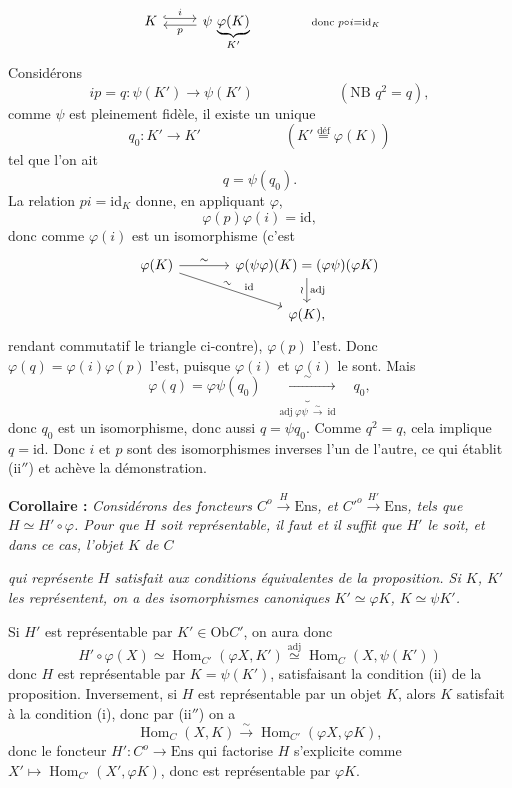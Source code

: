 \documentclass[11pt]{article}
\newcommand{\printedpage}[1]{\marginpar{\footnotesize p.~#1}}
\newcommand{\msp}[1]{\marginpar{\footnotesize [#1]}}
\newcommand{\Hom}{\operatorname{Hom}}
\newcommand{\Ens}{\mathrm{Ens}}
\newcommand{\Ob}{\mathrm{Ob}}
\newcommand{\id}{\mathrm{id}}
\begin{document}
\[
\begin{tikzcd}
K \arrow[r,hook,shift left,"i"] & \psi\,\underbrace{\varphi(K)}_{K'} \arrow[l,shift left,"p"]
\end{tikzcd}
\qquad\qquad {\scriptstyle \text{donc } p\circ i = \id_K}
\]
Considérons
\[
ip = q : \psi(K') \longrightarrow \psi(K') \qquad\qquad\qquad (\text{NB } q^2 = q),
\]
comme $\psi$ est pleinement fidèle, il existe un unique
\[
q_0 : K' \longrightarrow K' \qquad\qquad\qquad (K' \overset{\text{déf}}{=} \varphi(K))
\]
tel que l'on ait
\[
q = \psi(q_0).
\]
La relation $pi = \id_K$ donne, en appliquant $\varphi$,
\[
\varphi(p)\varphi(i) = \id,
\]
donc comme $\varphi(i)$ est un isomorphisme (c'est
\[
\begin{tikzcd}[column sep=large]
\varphi(K) \arrow[r,"\sim"] \arrow[dr,"\sim"{sloped,pos=0.45},"\id"{pos=0.6}] & \varphi(\psi\varphi)(K) = (\varphi\psi)(\varphi K) \arrow[d,"\wr"',"\mathrm{adj}"] \\
 & \varphi(K),
\end{tikzcd}
\]
rendant commutatif le triangle ci-contre), $\varphi(p)$ l'est. Donc $\varphi(q) = \varphi(i)\varphi(p)$ l'est, puisque $\varphi(i)$ et $\varphi(i)$ le sont. Mais
\[
\varphi(q) = \varphi\psi(q_0) \quad \underbrace{\xrightarrow{\ \sim\ }}_{\mathrm{adj}\ \varphi\psi\ \xrightarrow{\sim}\ \id} \quad q_0,
\]
donc $q_0$ est un isomorphisme, donc aussi $q = \psi q_0$. Comme $q^2 = q$, cela implique $q = \id$. Donc $i$ et $p$ sont des isomorphismes inverses l'un de l'autre, ce qui établit (ii$''$) et achève la démonstration.

\textbf{Corollaire :} \textit{Considérons des foncteurs $C^o \xrightarrow{H} \Ens$, et $C'^o \xrightarrow{H'} \Ens$, tels que $H \simeq H'\circ\varphi$. Pour que $H$ soit représentable, il faut et il suffit que $H'$ le soit, et dans ce cas, l'objet $K$ de $C$}

\noindent\msp{page 40}%
\textit{qui représente $H$ satisfait aux conditions équivalentes de la proposition. Si $K$, $K'$ les représentent, on a des isomorphismes canoniques $K' \simeq \varphi K$, $K \simeq \psi K'$.}

Si $H'$ est représentable par $K' \in \Ob C'$, on aura donc
\[
H'\circ\varphi(X) \simeq \Hom_{C'}(\varphi X,K') \overset{\mathrm{adj}}{\simeq} \Hom_C(X,\psi(K'))
\]
\printedpage{26}
donc $H$ est représentable par $K = \psi(K')$, satisfaisant la condition (ii) de la proposition. Inversement, si $H$ est représentable par un objet $K$, alors $K$ satisfait à la condition (i), donc par (ii$''$) on a
\[
\Hom_C(X,K) \xrightarrow{\sim} \Hom_{C'}(\varphi X,\varphi K),
\]
donc le foncteur $H' : C^o \longrightarrow \Ens$ qui factorise $H$ s'explicite comme $X' \longmapsto \Hom_{C'}(X',\varphi K)$, donc est représentable par $\varphi K$. %
\end{document}
